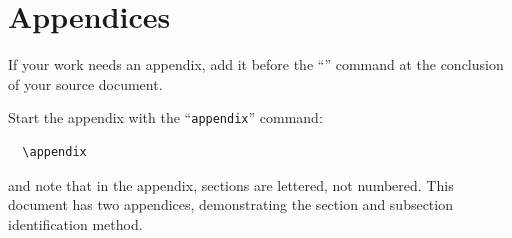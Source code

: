 \section{Appendices}

If your work needs an appendix, add it before the
``\verb||'' command at the conclusion of your source
document.

Start the appendix with the ``\verb|appendix|'' command:
\begin{verbatim}
  \appendix
\end{verbatim}
and note that in the appendix, sections are lettered, not
numbered. This document has two appendices, demonstrating the section
and subsection identification method.
